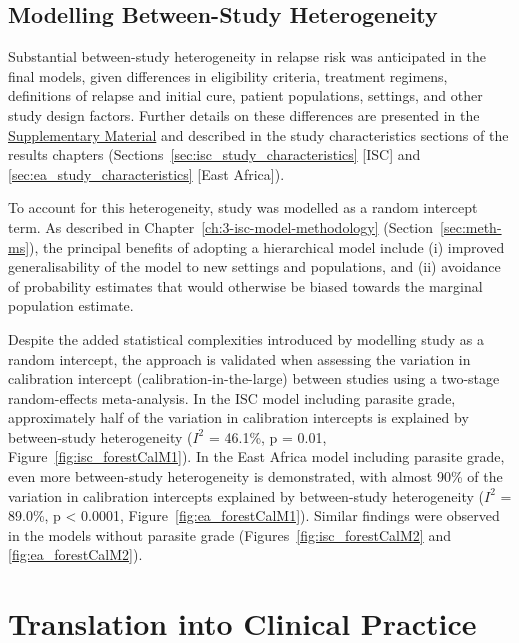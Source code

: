 \subsection{Modelling Between-Study Heterogeneity\label{sec:modelling-heterogeneity}}

Substantial between-study heterogeneity in relapse risk was anticipated in the final models, given differences in eligibility criteria, treatment regimens, definitions of relapse and initial cure, patient populations, settings, and other study design factors. Further details on these differences are presented in the \href{https://github.com/jpwil/dphil}{Supplementary Material} and described in the study characteristics sections of the results chapters (Sections~\ref{sec:isc_study_characteristics} [ISC] and \ref{sec:ea_study_characteristics} [East Africa]).

To account for this heterogeneity, study was modelled as a random intercept term. As described in Chapter~\ref{ch:3-isc-model-methodology} (Section~\ref{sec:meth-ms}), the principal benefits of adopting a hierarchical model include (i) improved generalisability of the model to new settings and populations, and (ii) avoidance of probability estimates that would otherwise be biased towards the marginal population estimate\cite{debray2023,wynants2020,steyerberg2019}.

Despite the added statistical complexities introduced by modelling study as a random intercept, the approach is validated when assessing the variation in calibration intercept (calibration-in-the-large) between studies using a two-stage random-effects meta-analysis. In the ISC model including parasite grade, approximately half of the variation in calibration intercepts is explained by between-study heterogeneity ($I^2$ = 46.1\%, p = 0.01, Figure~\ref{fig:isc_forestCalM1}). In the East Africa model including parasite grade, even more between-study heterogeneity is demonstrated, with almost 90\% of the variation in calibration intercepts explained by between-study heterogeneity ($I^2$ = 89.0\%, p < 0.0001, Figure~\ref{fig:ea_forestCalM1}). Similar findings were observed in the models without parasite grade (Figures~\ref{fig:isc_forestCalM2} and \ref{fig:ea_forestCalM2}).

\section{Translation into Clinical Practice}

